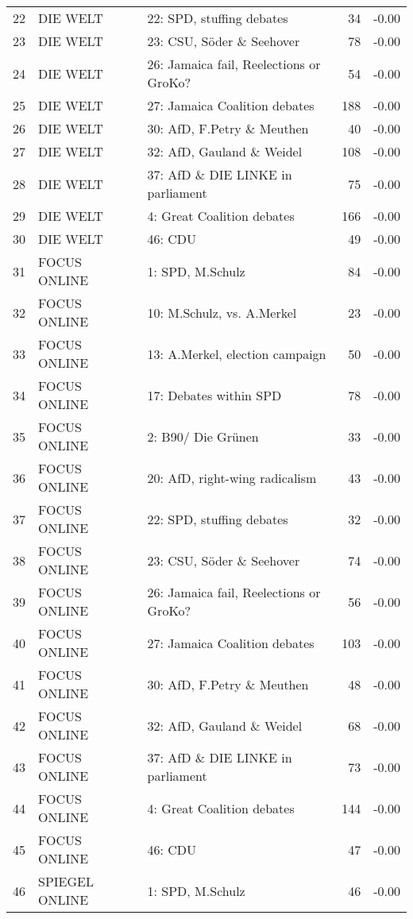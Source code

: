\begin{table}[ht]
\begin{adjustbox}{width=\textwidth,totalheight=\textheight,keepaspectratio}
\begin{tabular}{rllrr}
  22 & DIE WELT & 22: SPD, stuffing debates &  34 & -0.00 \\ 
  23 & DIE WELT & 23: CSU, Söder \& Seehover &  78 & -0.00 \\ 
  24 & DIE WELT & 26: Jamaica fail, Reelections or GroKo? &  54 & -0.00 \\ 
  25 & DIE WELT & 27: Jamaica Coalition debates & 188 & -0.00 \\ 
  26 & DIE WELT & 30: AfD, F.Petry \& Meuthen &  40 & -0.00 \\ 
  27 & DIE WELT & 32: AfD, Gauland \& Weidel & 108 & -0.00 \\ 
  28 & DIE WELT & 37: AfD \& DIE LINKE in parliament &  75 & -0.00 \\ 
  29 & DIE WELT & 4: Great Coalition debates & 166 & -0.00 \\ 
  30 & DIE WELT & 46: CDU &  49 & -0.00 \\ 
  31 & FOCUS ONLINE & 1: SPD, M.Schulz &  84 & -0.00 \\ 
  32 & FOCUS ONLINE & 10: M.Schulz, vs. A.Merkel &  23 & -0.00 \\ 
  33 & FOCUS ONLINE & 13: A.Merkel, election campaign &  50 & -0.00 \\ 
  34 & FOCUS ONLINE & 17: Debates within SPD &  78 & -0.00 \\ 
  35 & FOCUS ONLINE & 2: B90/ Die Grünen &  33 & -0.00 \\ 
  36 & FOCUS ONLINE & 20: AfD, right-wing radicalism &  43 & -0.00 \\ 
  37 & FOCUS ONLINE & 22: SPD, stuffing debates &  32 & -0.00 \\ 
  38 & FOCUS ONLINE & 23: CSU, Söder \& Seehover &  74 & -0.00 \\ 
  39 & FOCUS ONLINE & 26: Jamaica fail, Reelections or GroKo? &  56 & -0.00 \\ 
  40 & FOCUS ONLINE & 27: Jamaica Coalition debates & 103 & -0.00 \\ 
  41 & FOCUS ONLINE & 30: AfD, F.Petry \& Meuthen &  48 & -0.00 \\ 
  42 & FOCUS ONLINE & 32: AfD, Gauland \& Weidel &  68 & -0.00 \\ 
  43 & FOCUS ONLINE & 37: AfD \& DIE LINKE in parliament &  73 & -0.00 \\ 
  44 & FOCUS ONLINE & 4: Great Coalition debates & 144 & -0.00 \\ 
  45 & FOCUS ONLINE & 46: CDU &  47 & -0.00 \\ 
  46 & SPIEGEL ONLINE & 1: SPD, M.Schulz &  46 & -0.00 \\ 

\end{tabular}
\end{adjustbox}
\end{table}
